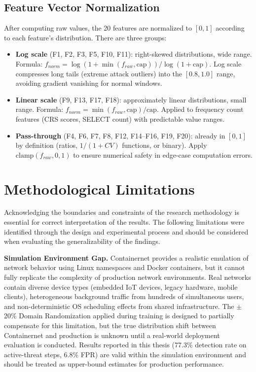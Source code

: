 \documentclass[12pt,a4paper]{report}
\begin{document}
\subsection{Feature Vector Normalization}

After computing raw values, the 20 features are normalized to $[0,1]$ according to each feature's distribution. There are three groups:

\begin{itemize}
  \item \textbf{Log scale} (F1, F2, F3, F5, F10, F11): right-skewed distributions, wide range. Formula: $f_{norm} = \log(1 + \min(f_{raw}, \text{cap})) / \log(1 + \text{cap})$. Log scale compresses long tails (extreme attack outliers) into the $[0.8, 1.0]$ range, avoiding gradient vanishing for normal windows.
  \item \textbf{Linear scale} (F9, F13, F17, F18): approximately linear distributions, small range. Formula: $f_{norm} = \min(f_{raw}, \text{cap}) / \text{cap}$. Applied to frequency count features (CRS scores, SELECT count) with predictable value ranges.
  \item \textbf{Pass-through} (F4, F6, F7, F8, F12, F14--F16, F19, F20): already in $[0,1]$ by definition (ratios, $1/(1+CV)$ functions, or binary). Apply $\text{clamp}(f_{raw}, 0, 1)$ to ensure numerical safety in edge-case computation errors.
\end{itemize}

\section{Methodological Limitations}

Acknowledging the boundaries and constraints of the research methodology is essential for correct interpretation of the results. The following limitations were identified through the design and experimental process and should be considered when evaluating the generalizability of the findings.

\textbf{Simulation Environment Gap.} Containernet provides a realistic emulation of network behavior using Linux namespaces and Docker containers, but it cannot fully replicate the complexity of production network environments. Real networks contain diverse device types (embedded IoT devices, legacy hardware, mobile clients), heterogeneous background traffic from hundreds of simultaneous users, and non-deterministic OS scheduling effects from shared infrastructure. The $\pm$20\% Domain Randomization applied during training is designed to partially compensate for this limitation, but the true distribution shift between Containernet and production is unknown until a real-world deployment evaluation is conducted. Results reported in this thesis (77.3\% detection rate on active-threat steps, 6.8\% FPR) are valid within the simulation environment and should be treated as upper-bound estimates for production performance.
\end{document}
